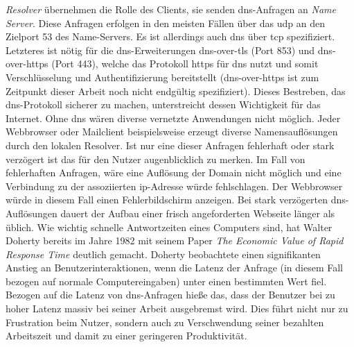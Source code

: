 \documentclass[titlepage]{report}
\begin{document}
\emph{Resolver} übernehmen die Rolle des Clients, sie senden
\gls{dns}\hyp{}Anfragen an \emph{Name Server}. Diese
Anfragen erfolgen in den meisten Fällen über das \gls{udp} an den Zielport
53 des Name\hyp{}Servers\cite[Siehe Section 4.2.1]{RFC1035}. Es ist allerdings auch \gls{dns}
über \gls{tcp} spezifiziert\cite[Siehe Section 4.2.2]{RFC1035}.
Letzteres ist nötig für die \gls{dns}\hyp{}Erweiterungen
\gls{dns}\hyp{}over\hyp{}\gls{tls} (Port 853) und
\gls{dns}\hyp{}over\hyp{}\gls{https} (Port 443), welche das Protokoll
\gls{https} für
\gls{dns} nutzt und somit Verschlüsselung und Authentifizierung bereitstellt \cite{RFC7858}
(\gls{dns}\hyp{}over\hyp{}\gls{https} ist zum Zeitpunkt dieser Arbeit
noch nicht endgültig spezifiziert). Dieses Bestreben, das
\gls{dns}\hyp{}Protokoll sicherer
zu machen, unterstreicht dessen Wichtigkeit für das Internet. Ohne
\gls{dns} wären diverse vernetzte Anwendungen nicht möglich. Jeder
Webbrowser oder Mailclient beispielsweise erzeugt diverse
Namensauflösungen durch den lokalen Resolver. Ist nur
eine dieser Anfragen fehlerhaft oder stark verzögert ist das für den
Nutzer augenblicklich zu merken. Im Fall von fehlerhaften Anfragen, wäre
eine Auflösung der Domain nicht möglich und eine Verbindung zu der
assoziierten \gls{ip}\hyp{}Adresse würde fehlschlagen. Der Webbrowser
würde in diesem Fall einen Fehlerbildschirm anzeigen.
Bei stark verzögerten
\gls{dns}\hyp{}Auflösungen dauert der Aufbau einer frisch angeforderten
Webseite länger als üblich. Wie wichtig schnelle Antwortzeiten eines Computers
sind, hat Walter Doherty bereits im Jahre 1982 mit seinem Paper \emph{The
Economic Value of Rapid Response Time} deutlich gemacht. Doherty
beobachtete einen signifikanten Anstieg an Benutzerinteraktionen, wenn
die Latenz der Anfrage (in diesem Fall bezogen auf normale
Computereingaben) unter einen bestimmten Wert fiel\cite{DOHERTY}.
Bezogen auf die Latenz von \gls{dns}\hyp{}Anfragen hieße das, dass der
Benutzer bei zu hoher Latenz massiv bei seiner Arbeit ausgebremst wird. Dies führt nicht nur
zu Frustration beim Nutzer, sondern auch zu Verschwendung seiner
bezahlten Arbeitszeit und damit zu einer geringeren Produktivität.
\end{document}
